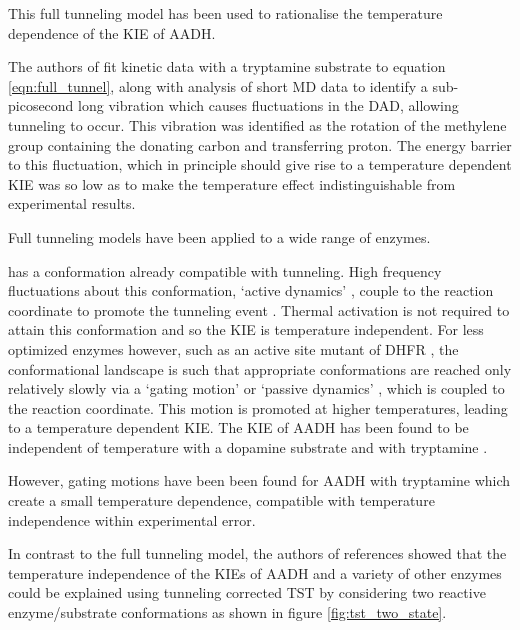 This full tunneling model has been used to rationalise the temperature dependence of the KIE of AADH. 


The authors of \cite{johannissenProtonTunnelingAromatic2007, johannissenEnzymeAromaticAmine2008} fit kinetic data with a tryptamine substrate to equation \ref{eqn:full_tunnel}, along with analysis of short MD data to identify a sub-picosecond long vibration which causes fluctuations in the DAD, allowing tunneling to occur. This vibration was identified as the rotation of the methylene group containing the donating carbon and transferring proton. The energy barrier to this fluctuation, which in principle should give rise to a temperature dependent KIE was so low as to make the temperature effect indistinguishable from experimental results. 




Full tunneling models have been applied to a wide range of enzymes. 


 has a conformation already compatible with tunneling. High frequency fluctuations about this conformation, `active dynamics' \cite{masgrau2004hydrogen}, couple to the reaction coordinate to promote the tunneling event \cite{klinmanbeyond2009, klinmanHydrogenTunnelingLinks2013}. Thermal activation is not required to attain this conformation and so the KIE is temperature independent. For less optimized enzymes however, such as an active site mutant of DHFR \cite{stojkovic2012effects}, the conformational landscape is such that appropriate conformations are reached only relatively slowly via a `gating motion' \cite{johannissenProtonTunnelingAromatic2007} or `passive dynamics' \cite{masgrau2004hydrogen}, which is coupled to the reaction coordinate. This motion is promoted at higher temperatures, leading to a temperature dependent KIE. The KIE of AADH has been found to be independent of temperature with a dopamine substrate \cite{basranImportanceBarrierShape2001a} and with tryptamine \cite{masgrauAtomicDescriptionEnzyme2006}. 
 
 However, gating motions have been been found for AADH with tryptamine \cite{johannissenEnzymeAromaticAmine2008, johannissenProtonTunnelingAromatic2007} which create a small temperature dependence, compatible with temperature independence within experimental error.

In contrast to the full tunneling model, the authors of references \cite{glowackiProteinDynamicsEnzyme2012a, glowackiTakingOckhamRazor2012b} showed that the temperature independence of the KIEs of AADH and a variety of other enzymes could be explained using tunneling corrected TST by considering  two reactive enzyme/substrate conformations as shown in figure \ref{fig:tst_two_state}. 

